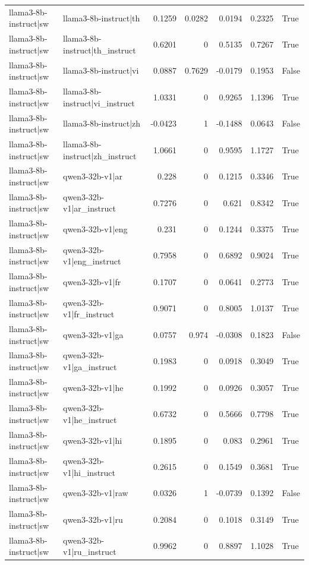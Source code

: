 \begin{table}
\begin{tabular}{l l r r r r l}
llama3-8b-instruct|sw & llama3-8b-instruct|th & 0.1259 & 0.0282 & 0.0194 & 0.2325 & True \\
llama3-8b-instruct|sw & llama3-8b-instruct|th_instruct & 0.6201 & 0 & 0.5135 & 0.7267 & True \\
llama3-8b-instruct|sw & llama3-8b-instruct|vi & 0.0887 & 0.7629 & -0.0179 & 0.1953 & False \\
llama3-8b-instruct|sw & llama3-8b-instruct|vi_instruct & 1.0331 & 0 & 0.9265 & 1.1396 & True \\
llama3-8b-instruct|sw & llama3-8b-instruct|zh & -0.0423 & 1 & -0.1488 & 0.0643 & False \\
llama3-8b-instruct|sw & llama3-8b-instruct|zh_instruct & 1.0661 & 0 & 0.9595 & 1.1727 & True \\
llama3-8b-instruct|sw & qwen3-32b-v1|ar & 0.228 & 0 & 0.1215 & 0.3346 & True \\
llama3-8b-instruct|sw & qwen3-32b-v1|ar_instruct & 0.7276 & 0 & 0.621 & 0.8342 & True \\
llama3-8b-instruct|sw & qwen3-32b-v1|eng & 0.231 & 0 & 0.1244 & 0.3375 & True \\
llama3-8b-instruct|sw & qwen3-32b-v1|eng_instruct & 0.7958 & 0 & 0.6892 & 0.9024 & True \\
llama3-8b-instruct|sw & qwen3-32b-v1|fr & 0.1707 & 0 & 0.0641 & 0.2773 & True \\
llama3-8b-instruct|sw & qwen3-32b-v1|fr_instruct & 0.9071 & 0 & 0.8005 & 1.0137 & True \\
llama3-8b-instruct|sw & qwen3-32b-v1|ga & 0.0757 & 0.974 & -0.0308 & 0.1823 & False \\
llama3-8b-instruct|sw & qwen3-32b-v1|ga_instruct & 0.1983 & 0 & 0.0918 & 0.3049 & True \\
llama3-8b-instruct|sw & qwen3-32b-v1|he & 0.1992 & 0 & 0.0926 & 0.3057 & True \\
llama3-8b-instruct|sw & qwen3-32b-v1|he_instruct & 0.6732 & 0 & 0.5666 & 0.7798 & True \\
llama3-8b-instruct|sw & qwen3-32b-v1|hi & 0.1895 & 0 & 0.083 & 0.2961 & True \\
llama3-8b-instruct|sw & qwen3-32b-v1|hi_instruct & 0.2615 & 0 & 0.1549 & 0.3681 & True \\
llama3-8b-instruct|sw & qwen3-32b-v1|raw & 0.0326 & 1 & -0.0739 & 0.1392 & False \\
llama3-8b-instruct|sw & qwen3-32b-v1|ru & 0.2084 & 0 & 0.1018 & 0.3149 & True \\
llama3-8b-instruct|sw & qwen3-32b-v1|ru_instruct & 0.9962 & 0 & 0.8897 & 1.1028 & True \\

\end{tabular}
\end{table}

